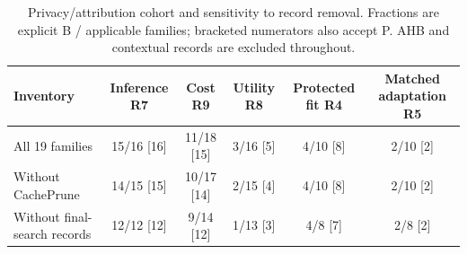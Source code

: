 \begin{table}[t]\centering\footnotesize
\caption{Privacy/attribution cohort and sensitivity to record removal. Fractions are explicit B / applicable families; bracketed numerators also accept P. AHB and contextual records are excluded throughout.}\label{tab:r35-census}
\begin{tabularx}{\textwidth}{@{}Yccccc@{}}\toprule
Inventory & Inference R7 & Cost R9 & Utility R8 & Protected fit R4 & Matched adaptation R5\\\midrule
All 19 families & 15/16 [16] & 11/18 [15] & 3/16 [5] & 4/10 [8] & 2/10 [2]\\
Without CachePrune & 14/15 [15] & 10/17 [14] & 2/15 [4] & 4/10 [8] & 2/10 [2]\\
Without final-search records & 12/12 [12] & 9/14 [12] & 1/13 [3] & 4/8 [7] & 2/8 [2]\\
\bottomrule\end{tabularx}\end{table}
